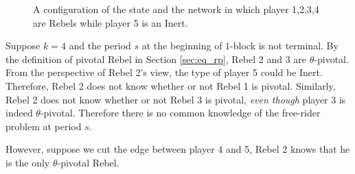 \documentclass[12pt,letter]{article}
\newtheorem{conjecture}{Conjecture}[section]
\theoremstyle{definition}
\theoremstyle{remark}
\theoremstyle{claim}
\begin{document}
\begin{figure}[!h]

\label{fig:cyclic_network}
\begin{center}
\end{center}
\caption{A configuration of the state and the network in which player 1,2,3,4 are Rebels while player 5 is an Inert.}
\end{figure}

Suppose $k=4$ and the period $s$ at the beginning of $1$-block is not terminal. By the definition of pivotal Rebel in Section \ref{sec:eq_rp}, Rebel 2 and 3 are $\theta$-pivotal. From the perspective of Rebel 2's view, the type of player 5 could be Inert. Therefore, Rebel 2 does not know whether or not Rebel 1 is pivotal. Similarly, Rebel 2 does not know whether or not Rebel 3 is pivotal, \textit{even though} player 3 is indeed $\theta$-pivotal. Therefore there is no common knowledge of the free-rider problem at period $s$.  

However, suppose we cut the edge between player 4 and 5, Rebel 2 knows that he is the only $\theta$-pivotal Rebel.


%
%
%
%
\end{document}
